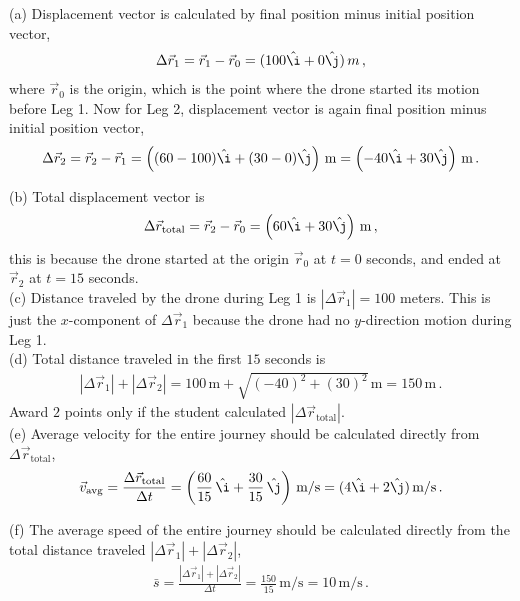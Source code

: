 \documentclass[11pt, onesided]{book}
\theoremstyle{break}
\theoremstyle{break}
\begin{document}
(a) Displacement vector is calculated by final position minus initial position vector,
\begin{align*}
\Delta\vec{r}_1 = \vec{r}_1 - \vec{r}_0 = (100 \hat{\i} + 0 \hat{\j})\, m\,,
\end{align*}
where $\vec{r}_0$ is the origin, which is the point where the drone started its motion before Leg 1. Now for Leg 2, displacement vector is again final position minus initial position vector, 
\begin{align*}
\Delta\vec{r}_2 = \vec{r}_2 - \vec{r}_1 = \left((60-100) \hat{\i} + (30-0) \hat{\j}\right)\, \text{m}= \left(-40 \hat{\i} + 30 \hat{\j}\right)\, \text{m}\,.
\end{align*} 

(b) Total displacement vector is 
\begin{align*}
\Delta\vec{r}_{\text{total}} = \vec{r}_2 - \vec{r}_0 =\left( 60 \hat{\i} + 30 \hat{\j}\right)\, \text{m}\,,
\end{align*}
this is because the drone started at the origin $\vec{r}_0$ at $t = 0$ seconds, and ended at $\vec{r}_2$ at $t = 15$ seconds.\\

(c) Distance traveled by the drone during Leg 1 is $|\Delta \vec{r}_1| = 100$ meters. This is just the $x$-component of $\Delta\vec{r}_1$ because the drone had no $y$-direction motion during Leg 1. \\

(d) Total distance traveled in the first $15$ seconds is
\begin{align*}
|\Delta \vec{r}_1| + |\Delta \vec{r}_2| = 100 \,\text{m} + \sqrt{(-40)^2 + (30)^2}\,\text{m} = 150 \,\text{m}\,.
\end{align*}
Award $2$ points only if the student calculated $|\Delta\vec{r}_{\text{total}}|$. \\

(e) Average velocity for the entire journey should be calculated directly from $\Delta\vec{r}_{\text{total}}$, 
\begin{align*}
\vec{v}_{\text{avg}} = \frac{\Delta\vec{r}_{\text{total}}}{\Delta t} = \left(\frac{60}{15}\,\hat{\i} + \frac{30}{15}\,\hat{\j}\right)\,\text{m/s} = (4\hat{\i}+2\hat{\j})\,\text{m/s}\,. 
\end{align*}

(f) The average speed of the entire journey should be calculated directly from the total distance traveled $|\Delta \vec{r}_1| + |\Delta \vec{r}_2|$, 
\begin{align*}
\bar{s} = \frac{|\Delta \vec{r}_1| + |\Delta \vec{r}_2|}{\Delta t} = \frac{150}{15}\,\text{m/s} = 10\,\text{m/s}\,.
\end{align*}
\end{document}

